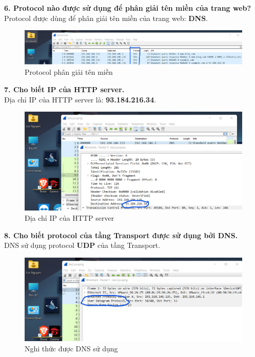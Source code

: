 \textbf{6.	Protocol nào được sử dụng để phân giải tên miền của trang web?}\\
Protocol được dùng để phân giải tên miền của trang web: \textbf{DNS}.
\begin{figure}[H]
\begin{center}
\includegraphics[scale=1]{../figures/p2/p2_protocol1}
\end{center}
\caption{Protocol phân giải tên miền}
\end{figure}

\textbf{7.	Cho biết IP của HTTP server.}\\
Địa chỉ IP của HTTP server là: \textbf{93.184.216.34}.
\begin{figure}[H]
\begin{center}
\includegraphics[scale=1]{../figures/p2/p2_httpserverip}
\end{center}
\caption{Địa chỉ IP của HTTP server}
\end{figure}

\textbf{8.	Cho biết protocol của tầng Transport được sử dụng bởi DNS.}\\
DNS sử dụng protocol \textbf{UDP} của tầng Transport.
\begin{figure}[H]
\begin{center}
\includegraphics[scale=1]{../figures/p2/p2_dnsprotocol}
\end{center}
\caption{Nghi thức được DNS sử dụng}
\end{figure}

